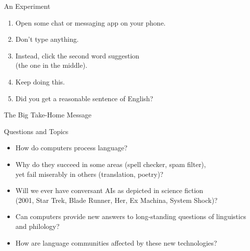 \documentclass[professionalfonts, xcolor={usenames,svgnames,x11names,table}]{beamer}
\begin{document}
\begin{frame}{An Experiment}
    \begin{enumerate}
        \item Open some chat or messaging app on your phone.
        \item Don't type anything.
        \item Instead, click the second word suggestion\\
              (the one in the middle).
        \item Keep doing this.
        \item Did you get a reasonable sentence of English?
    \end{enumerate}

\end{frame}

\begin{frame}{The Big Take-Home Message}
    \begin{center}
    \end{center}
\end{frame}

\begin{frame}{Questions and Topics}
    \begin{itemize}
        \item How do computers process language?
        \item Why do they succeed in some areas (spell checker, spam filter),\\
            yet fail miserably in others (translation, poetry)?
        \item Will we ever have conversant AIs as depicted in science fiction\\
            (2001, Star Trek, Blade Runner, Her, Ex Machina, System Shock)?
        \item Can computers provide new answers to long-standing questions of linguistics and philology?
        \item How are language communities affected by these new technologies?
    \end{itemize}
\end{frame}
\end{document}
